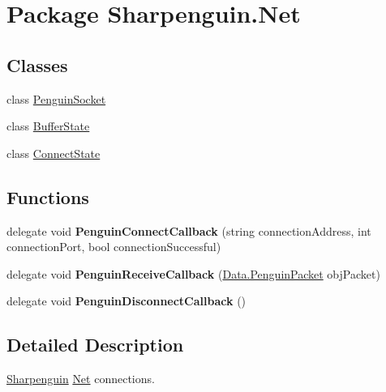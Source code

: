 \hypertarget{namespaceSharpenguin_1_1Net}{\section{Package Sharpenguin.\-Net}
\label{namespaceSharpenguin_1_1Net}
}
\subsection*{Classes}
\begin{DoxyCompactItemize}
\item 
class \hyperlink{classSharpenguin_1_1Net_1_1PenguinSocket}{Penguin\-Socket}
\item 
class \hyperlink{classSharpenguin_1_1Net_1_1BufferState}{Buffer\-State}
\item 
class \hyperlink{classSharpenguin_1_1Net_1_1ConnectState}{Connect\-State}
\end{DoxyCompactItemize}
\subsection*{Functions}
\begin{DoxyCompactItemize}
\item 
\hypertarget{namespaceSharpenguin_1_1Net_a4a6290e979560899e5a2f0f444905a30}{delegate void {\bfseries Penguin\-Connect\-Callback} (string connection\-Address, int connection\-Port, bool connection\-Successful)}\label{namespaceSharpenguin_1_1Net_a4a6290e979560899e5a2f0f444905a30}

\item 
\hypertarget{namespaceSharpenguin_1_1Net_a9dd0c23bfe5647606a87eca32341b17b}{delegate void {\bfseries Penguin\-Receive\-Callback} (\hyperlink{classSharpenguin_1_1Data_1_1PenguinPacket}{Data.\-Penguin\-Packet} obj\-Packet)}\label{namespaceSharpenguin_1_1Net_a9dd0c23bfe5647606a87eca32341b17b}

\item 
\hypertarget{namespaceSharpenguin_1_1Net_a2a00d3d8b50911f340b3126504587edc}{delegate void {\bfseries Penguin\-Disconnect\-Callback} ()}\label{namespaceSharpenguin_1_1Net_a2a00d3d8b50911f340b3126504587edc}

\end{DoxyCompactItemize}


\subsection{Detailed Description}
\hyperlink{namespaceSharpenguin}{Sharpenguin} \hyperlink{namespaceSharpenguin_1_1Net}{Net} connections. 